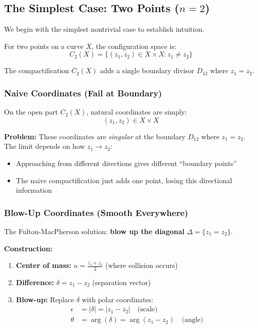 \subsection{The Simplest Case: Two Points ($n=2$)}

We begin with the simplest nontrivial case to establish intuition.

\begin{example}\label{ex:coords-n2}
For two points on a curve $X$, the configuration space is:
$$C_2(X) = \{(z_1, z_2) \in X \times X : z_1 \neq z_2\}$$

The compactification $\overline{C}_2(X)$ adds a single boundary divisor $D_{12}$ where
$z_1 = z_2$.

\subsubsection{Naive Coordinates (Fail at Boundary)}

On the open part $C_2(X)$, natural coordinates are simply:
$$(z_1, z_2) \in X \times X$$

\textbf{Problem:} These coordinates are \emph{singular} at the boundary $D_{12}$ where
$z_1 = z_2$. The limit depends on how $z_1 \to z_2$:
\begin{itemize}
\item Approaching from different directions gives different ``boundary points''
\item The naive compactification just adds one point, losing this directional information
\end{itemize}

\subsubsection{Blow-Up Coordinates (Smooth Everywhere)}

The Fulton-MacPherson solution: \textbf{blow up the diagonal} $\Delta = \{z_1 = z_2\}$.

\textbf{Construction:}
\begin{enumerate}
\item \textbf{Center of mass:} $u = \frac{z_1 + z_2}{2}$ (where collision occurs)

\item \textbf{Difference:} $\delta = z_1 - z_2$ (separation vector)

\item \textbf{Blow-up:} Replace $\delta$ with polar coordinates:
\begin{align*}
\epsilon &= |\delta| = |z_1 - z_2| \quad \text{(scale)}\\
\theta &= \arg(\delta) = \arg(z_1 - z_2) \quad \text{(angle)}
\end{align*}


\end{enumerate}
\end{example}
